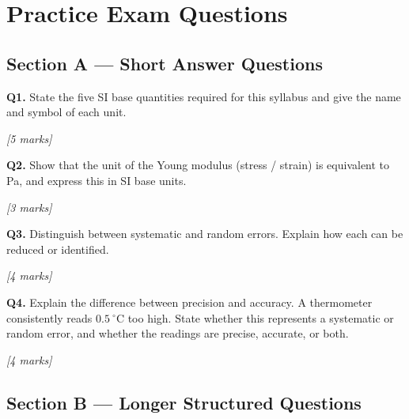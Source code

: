 \pagebreak

\section{Practice Exam Questions}

\subsection*{Section A --- Short Answer Questions}

\begin{tcolorbox}[colback=white, colframe=midblue, breakable]

\begin{minipage}{\linewidth}
\textbf{Q1.} State the five SI base quantities required for this syllabus and give the name and symbol of each unit.
\par\hfill\textit{[5 marks]}
\vspace{4cm}
\end{minipage}

\begin{minipage}{\linewidth}
\textbf{Q2.} Show that the unit of the Young modulus (stress / strain) is equivalent to Pa, and express this in SI base units.
\par\hfill\textit{[3 marks]}
\vspace{3.5cm}
\end{minipage}

\begin{minipage}{\linewidth}
\textbf{Q3.} Distinguish between systematic and random errors. Explain how each can be reduced or identified.
\par\hfill\textit{[4 marks]}
\vspace{4cm}
\end{minipage}

\begin{minipage}{\linewidth}
\textbf{Q4.} Explain the difference between precision and accuracy. A thermometer consistently reads $0.5\ ^\circ\text{C}$ too high. State whether this represents a systematic or random error, and whether the readings are precise, accurate, or both.
\par\hfill\textit{[4 marks]}
\vspace{4cm}
\end{minipage}

\end{tcolorbox}

\subsection*{Section B --- Longer Structured Questions}

